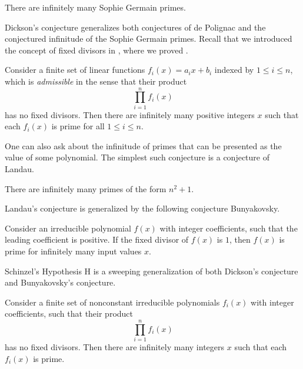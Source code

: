 \begin{conjecture}
  There are infinitely many Sophie Germain primes.
\end{conjecture}

Dickson's conjecture generalizes both conjectures of de Polignac and the conjectured infinitude of the Sophie Germain primes. Recall that we introduced the concept of fixed divisors in , where we proved .

\begin{conjecture}
  Consider a finite set of linear functions $f_i(x)=a_ix+b_i$ indexed by $1\leq i\leq n$, which is \emph{admissible} in the sense that their product
  \begin{equation*}
    \prod_{i=1}^n f_i(x)
  \end{equation*}
  has no fixed divisors. Then there are infinitely many positive integers $x$ such that each $f_i(x)$ is prime for all $1\leq i\leq n$.
\end{conjecture}

One can also ask about the infinitude of primes that can be presented as the value of some polynomial. The simplest such conjecture is a conjecture of Landau.

\begin{conjecture}
  There are infinitely many primes of the form $n^2+1$.
\end{conjecture}

Landau's conjecture is generalized by the following conjecture Bunyakovsky.

\begin{conjecture}
  Consider an irreducible polynomial $f(x)$ with integer coefficients, such that the leading coefficient is positive. If the fixed divisor of $f(x)$ is $1$, then $f(x)$ is prime for infinitely many input values $x$.
\end{conjecture}

Schinzel's Hypothesis H is a sweeping generalization of both Dickson's conjecture and Bunyakovsky's conjecture.

\begin{conjecture}
  Consider a finite set of nonconstant irreducible polynomials $f_i(x)$ with integer coefficients, such that their product
  \begin{equation*}
    \prod_{i=1}^nf_i(x)
  \end{equation*}
  has no fixed divisors. Then there are infinitely many integers $x$ such that each $f_i(x)$ is prime.
\end{conjecture}

